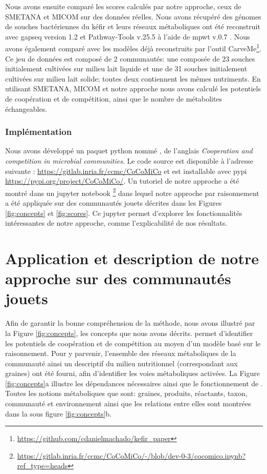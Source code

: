 \documentclass[../main.tex]{subfiles}
\begin{document}
Nous avons ensuite comparé les scores calculés par notre approche, ceux de SMETANA et MICOM sur des données réelles. Nous avons récupéré des génomes de souches bactériennes du kéfir \citep{Blasche.2021} et leurs réseaux métaboliques ont été reconstruit avec gapseq version 1.2 \citep{Zimmermann2021} et Pathway-Tools v.25.5 \citep{Karp2022} à l'aide de mpwt v.0.7 \citep{Belcour.2020}. Nous avons également comparé avec les modèles déjà reconstruits par l'outil CarveMe\footnote{\url{https://github.com/cdanielmachado/kefir\_paper}}. Ce jeu de données est composé de 2 communautés: une composée de 23 souches initialement cultivées sur milieu lait liquide et une de 31 souches initialement cultivées sur milieu lait solide; toutes deux contiennent les mêmes nutriments. En utilisant SMETANA, MICOM et notre approche nous avons calculé les potentiels de coopération et de compétition, ainsi que le nombre de métabolites échangeables.

\subsubsection{Implémentation}
Nous avons développé un paquet python nommé \ccmc, de l'anglais \textit{Cooperation and competition in microbial communities}. Le code source est disponible à l'adresse suivante : \url{https://gitlab.inria.fr/ccmc/CoCoMiCo} et est installable avec pypi \href{https://pypi.org/project/CoCoMiCo/}{https://pypi.org/project/CoCoMiCo/}.
Un tutoriel de notre approche a été montré dans un jupyter notebook \footnote{\url{https://gitlab.inria.fr/ccmc/CoCoMiCo/-/blob/dev-0-3/cocomico.ipynb?ref_type=heads}} dans lequel notre approche par raisonnement a été appliquée sur des communautés jouets décrites dans les Figures \ref{fig:concepts} et \ref{fig:scores}. Ce jupyter permet d'explorer les fonctionnalités intéressantes de notre approche, comme l'explicabilité de nos résultats. 

\section{Application et description de notre approche sur des communautés jouets}
Afin de garantir la bonne compréhension de la méthode, nous avons illustré par la Figure \ref{fig:concepts}, les concepts que nous avons décrits. \ccmc permet d'identifier les potentiels de coopération et de compétition au moyen d'un modèle basé sur le raisonnement. Pour y parvenir, l'ensemble des réseaux métaboliques de la communauté ainsi un descriptif du milieu nutritionnel (correspondant aux graines) ont été fourni, afin d'identifier les voies métaboliques activées. La Figure \ref{fig:concepts}a illustre les dépendances nécessaires ainsi que le fonctionnement de \ccmc. Toutes les notions métaboliques que sont: graines, produits, réactants, taxon, communauté et environnement ainsi que les relations entre elles sont montrées dans la sous figure \ref{fig:concepts}b. \\
\end{document}
